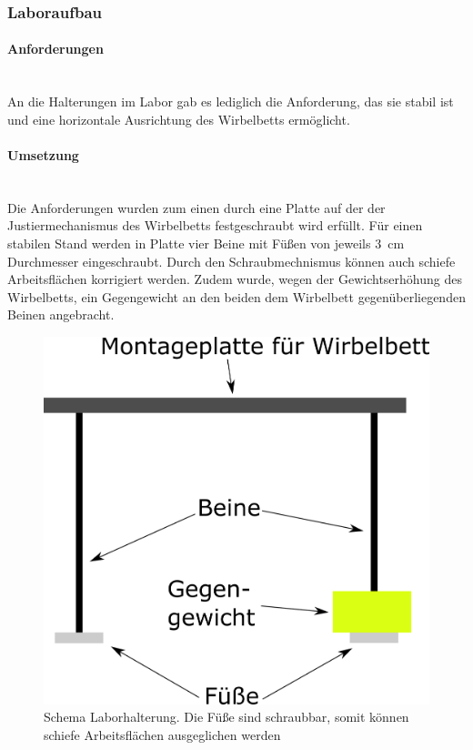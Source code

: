 \clearpage

\subsubsection{Laboraufbau}

\paragraph{Anforderungen}
\hfill \\
An die Halterungen im Labor gab es lediglich die Anforderung, das sie stabil ist und eine horizontale Ausrichtung des Wirbelbetts ermöglicht.

\paragraph{Umsetzung}
\hfill \\
Die Anforderungen wurden zum einen durch eine Platte auf der der Justiermechanismus des Wirbelbetts festgeschraubt wird erfüllt. Für einen stabilen Stand werden in Platte vier Beine mit Füßen von jeweils \SI{3}{cm} Durchmesser eingeschraubt. Durch den Schraubmechnismus können auch schiefe Arbeitsflächen korrigiert werden. Zudem wurde, wegen der Gewichtserhöhung des Wirbelbetts, ein Gegengewicht an den beiden dem Wirbelbett gegenüberliegenden Beinen angebracht.



\begin{figure}[h!]
	\begin{center}
	\includegraphics[scale=0.7]{Halterung_Labor_Seite.png}
	\caption[Halterung Labor]{Schema Laborhalterung. Die Füße sind schraubbar, somit können schiefe Arbeitsflächen ausgeglichen werden}
    \end{center}
\end{figure}

